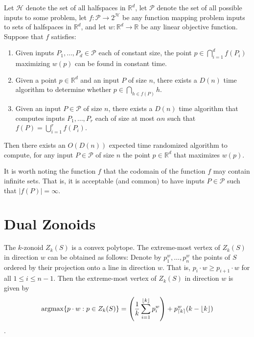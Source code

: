 \documentclass[lotsofwhite]{patmorin}
\newcommand{\argmax}{\mathrm{argmax}}
\begin{document}
\begin{thm}[Chan 2004]
Let $\mathcal{H}$ denote the set of all halfspaces in $\mathbb{R}^d$,
let $\mathcal{P}$ denote the set of all possible inputs to some problem, 
let $f:\mathcal{P}\rightarrow 2^{\mathcal{H}}$ be any function mapping 
problem inputs to sets of halfspaces in $\mathbb{R}^d$,
and let $w:\mathbb{R}^d\rightarrow \mathbb{R}$ be
any linear objective function.  Suppose that $f$ satisfies:
\begin{enumerate}

\item Given inputs $P_1,\ldots,P_d\in\mathcal{P}$ each of constant
size, the point $p\in\bigcap_{i=1}^d f(P_i)$ maximizing $w(p)$ can be
found in constant time.

\item Given a point $p\in\mathbb{R}^d$ and an input $P$ of size $n$,
there exists a $D(n)$ time algorithm to determine whether
$p\in\bigcap_{h\in f(P)} h$.

\item Given an input $P\in\mathcal{P}$ of size $n$, there exists a $D(n)$ time
algorithm that computes inputs $P_1,\ldots,P_r$ each of size at most
$\alpha n$ such that 
$f(P) = \bigcup_{i=1}^r f(P_i)$.
\end{enumerate}
Then there exists an $O(D(n))$ expected time randomized algorithm to
compute, for any input $P\in\mathcal{P}$ of size $n$ the point
$p\in\mathbb{R}^d$ that maximizes $w(p)$.
\end{thm}

It is worth noting the function $f$ that the codomain of the function
$f$ may contain infinite sets.  That is, it is acceptable (and common)
to have inputs $P\in\mathcal{P}$ such that $|f(P)|=\infty$.


\section{Dual Zonoids}

The $k$-zonoid $Z_k(S)$ is a convex polytope.  The extreme-most vertex
of $Z_k(S)$ in direction $w$ can be obtained as follows:  Denote by
$p_1^w,\ldots,p_n^w$ the points of $S$ ordered by their projection
onto a line in direction $w$.  That is, $p_i\cdot w \ge p_{i+1}\cdot
w$ for all $1\le i\le n-1$.  Then the extreme-most vertex of $Z_k(S)$
in direction $w$ is given by 
\[  
   \argmax\{p\cdot w: p\in Z_k(S)\} =
\left(\frac{1}{k}\sum_{i=1}^{\floor{k}} p_i^w\right) +
          p_{\ceil{k}}^w(k-\floor{k})
\]
\cite{beXX,gmXX}.
\end{document}
